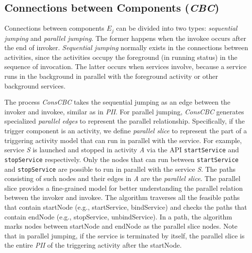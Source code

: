 \subsection{Connections between Components (\textit{CBC})}
Connections between components $E_j$ can be divided into two types: \textit{sequential jumping} and \textit{parallel jumping}. The former happens when the invokee occurs after the end of invoker. \textit{Sequential jumping} normally exists in the connections between activities, since the activities occupy the foreground (in running status) in the sequence of invocation. The latter occurs when services involve, because a service runs in the background in parallel with the foreground activity or other background services.

The process \textit{ConsCBC} takes the sequential jumping as an edge between the invoker and invokee, similar as in \textit{PII}. For parallel jumping, \textit{ConsCBC} generates specialized \textit{parallel edges} to represent the parallel relationship. 
Specifically, if the trigger component is an activity, we define \textit{parallel slice} to represent the part of a triggering activity model that can run in parallel with the service. For example, service \textit{S} is launched and stopped in activity \textit{A} via the API \texttt{startService} and \texttt{stopService} respectively. Only the nodes that can run between \texttt{startService} and \texttt{stopService} are possible to run in parallel with the service \textit{S}. The paths consisting of such nodes and their edges in \textit{A} are the \textit{parallel slice}. The parallel slice provides a fine-grained model for better understanding the parallel relation between the invoker and invokee. 
The algorithm traverses all the feasible paths that contain startNode (e.g., startService, bindService) and checks the paths that contain endNode (e.g., stopService, unbindService). In a path, the algorithm marks nodes between startNode and endNode as the parallel slice nodes. Note that in parallel jumping, if the service is terminated by itself, the parallel slice is the entire \textit{PII} of the triggering activity after the startNode.

